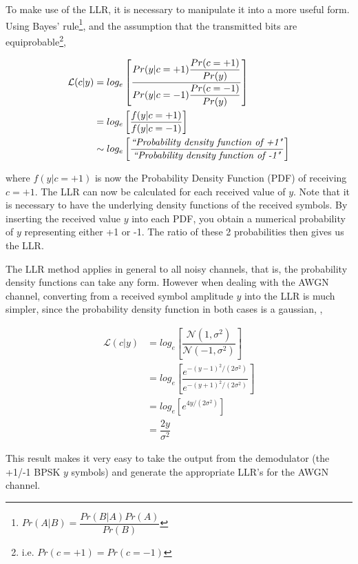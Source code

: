 \documentclass[11pt]{article}
\numberwithin{equation}{subsection}
\begin{document}
To make use of the LLR, it is necessary to manipulate it into a more useful form. Using Bayes' rule\footnote{$Pr(A|B) = \dfrac{Pr(B|A) Pr(A)}{Pr(B)}$}, and the assumption that the transmitted bits are equiprobable\footnote{i.e. $Pr(c=+1) = Pr(c=-1)$},

\begin{equation}
\begin{aligned}
\mathcal{L}(c|y) &= log_e \left[ \dfrac{Pr(y|c=+1) \dfrac{Pr(c=+1)}{Pr(y)}}{Pr(y|c=-1) \dfrac{Pr(c=-1)}{Pr(y)}} \right] 
\\
&= log_e \left[ \dfrac{f(y|c=+1)} {f(y|c=-1)} \right] 
\\
&\sim log_e \left[ \dfrac{\text{\textit{``Probability density function of +1"}}}{\text{\textit{``Probability density function of -1"}}} \right]
\end{aligned}
\end{equation}

\noindent where $f(y|c=+1)$ is now the Probability Density Function (PDF) of receiving $c=+1$. The LLR can now be calculated for each received value of $y$. Note that it is necessary to have the underlying density functions of the received symbols. By inserting the received value $y$ into each PDF, you obtain a numerical probability of $y$ representing either +1 or -1. The ratio of these 2 probabilities then gives us the LLR.

The LLR method applies in general to all noisy channels, that is, the probability density functions can take any form. However when dealing with the AWGN channel, converting from a received symbol amplitude $y$ into the LLR is much simpler, since the probability density function in both cases is a gaussian, \cite{cho2012analysis},

\begin{equation} \label{eq:LLR_awgn}
\begin{aligned}
\mathcal{L}(c|y) &= log_e \left[ \dfrac{\mathcal{N}(1,\sigma^2)} {\mathcal{N}(-1,\sigma^2)} \right] 
\\
&= log_e \left[ \dfrac{e^{-(y-1)^2/(2\sigma^2)}}{e^{-(y+1)^2/(2\sigma^2)}} \right]
\\
&= log_e \left[ e^{4y/(2\sigma^2)} \right]
\\
&= \dfrac{2y}{\sigma^2}
\end{aligned}
\end{equation}

\noindent This result makes it very easy to take the output from the demodulator (the +1/-1 BPSK $y$ symbols) and generate the appropriate LLR's for the AWGN channel.
\end{document}
